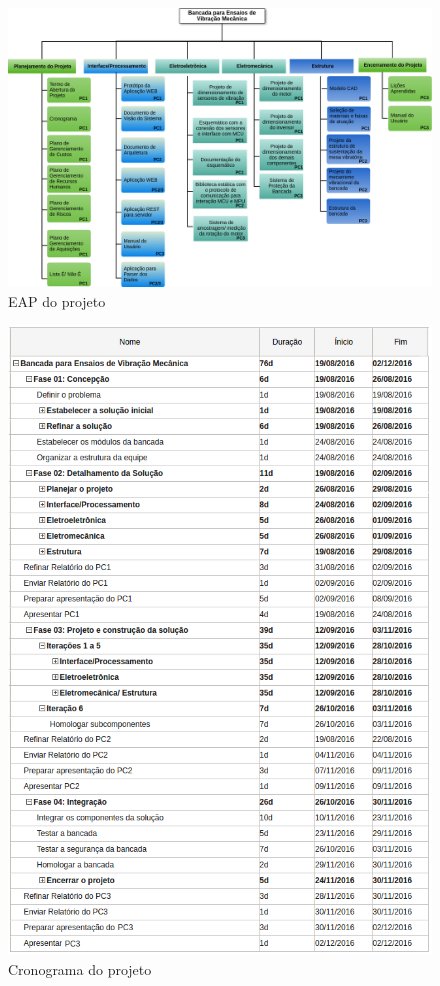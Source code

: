 \begin{figure}[!ht]
\centering
\includegraphics[keepaspectratio=true,scale=0.6,angle=90]{figuras/eap.png}
\caption{EAP do projeto}
\label{eap}
\end{figure}

\begin{figure}[!ht]
\centering
\includegraphics[scale=1]{figuras/cronograma_macro.png}
\caption{Cronograma do projeto}
\label{cronograma}
\end{figure}

